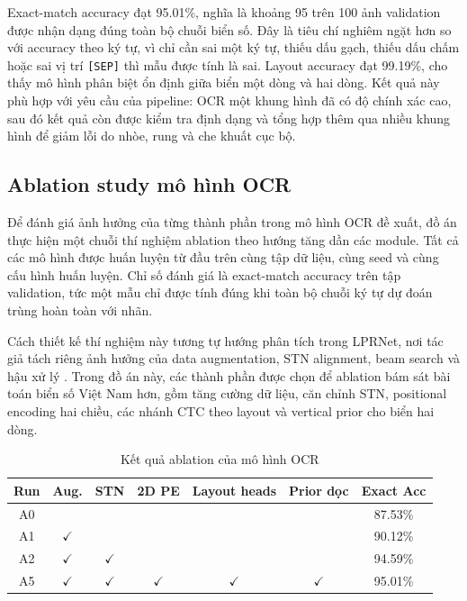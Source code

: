\documentclass[../DoAn.tex]{subfiles}
\begin{document}
Exact-match accuracy đạt 95.01\%, nghĩa là khoảng 95 trên 100 ảnh validation được nhận dạng đúng toàn bộ chuỗi biển số. Đây là tiêu chí nghiêm ngặt hơn so với accuracy theo ký tự, vì chỉ cần sai một ký tự, thiếu dấu gạch, thiếu dấu chấm hoặc sai vị trí \texttt{[SEP]} thì mẫu được tính là sai. Layout accuracy đạt 99.19\%, cho thấy mô hình phân biệt ổn định giữa biển một dòng và hai dòng. Kết quả này phù hợp với yêu cầu của pipeline: OCR một khung hình đã có độ chính xác cao, sau đó kết quả còn được kiểm tra định dạng và tổng hợp thêm qua nhiều khung hình để giảm lỗi do nhòe, rung và che khuất cục bộ.

\subsection{Ablation study mô hình OCR}
\label{subsection:5.2.5}

Để đánh giá ảnh hưởng của từng thành phần trong mô hình OCR đề xuất, đồ án thực hiện một chuỗi thí nghiệm ablation theo hướng tăng dần các module. Tất cả các mô hình được huấn luyện từ đầu trên cùng tập dữ liệu, cùng seed và cùng cấu hình huấn luyện. Chỉ số đánh giá là exact-match accuracy trên tập validation, tức một mẫu chỉ được tính đúng khi toàn bộ chuỗi ký tự dự đoán trùng hoàn toàn với nhãn.

Cách thiết kế thí nghiệm này tương tự hướng phân tích trong LPRNet, nơi tác giả tách riêng ảnh hưởng của data augmentation, STN alignment, beam search và hậu xử lý \cite{zherzdev2018lprnet}. Trong đồ án này, các thành phần được chọn để ablation bám sát bài toán biển số Việt Nam hơn, gồm tăng cường dữ liệu, căn chỉnh STN, positional encoding hai chiều, các nhánh CTC theo layout và vertical prior cho biển hai dòng.

\begin{table}[htbp]
\centering
\small
\caption{Kết quả ablation của mô hình OCR}
\label{tab:ocr-ablation-study}
\begin{tabular}{|c|c|c|c|c|c|c|}
\hline
\textbf{Run} & \textbf{Aug.} & \textbf{STN} & \textbf{2D PE} & \textbf{Layout heads} & \textbf{Prior dọc} & \textbf{Exact Acc} \\
\hline
A0 &  &  &  &  &  & 87.53\% \\
\hline
A1 & \(\checkmark\) &  &  &  &  & 90.12\% \\
\hline
A2 & \(\checkmark\) & \(\checkmark\) &  &  &  & 94.59\% \\
\hline
A5 & \(\checkmark\) & \(\checkmark\) & \(\checkmark\) & \(\checkmark\) & \(\checkmark\) & 95.01\% \\
\hline
\end{tabular}
\end{table}
\end{document}
